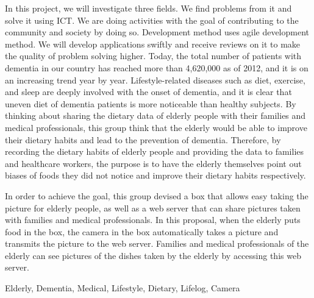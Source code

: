 \documentclass[../report]{subfiles}
\begin{document}
\begin{eabstract}
In this project, we will investigate three fields. We find problems from it and solve it using ICT. We are doing activities with the goal of contributing to the community and society by doing so. Development method uses agile development method. We will develop applications swiftly and receive reviews on it to make the quality of problem solving higher.
Today, the total number of patients with dementia in our country has reached more than 4,620,000 as of 2012, and it is on an increasing trend year by year. Lifestyle-related diseases such as diet, exercise, and sleep are deeply involved with the onset of dementia, and it is clear that uneven diet of dementia patients is more noticeable than healthy subjects. By thinking about sharing the dietary data of elderly people with their families and medical professionals, this group think that the elderly would be able to improve their dietary habits and lead to the prevention of dementia. Therefore, by recording the dietary habits of elderly people and providing the data to families and healthcare workers, the purpose is to have the elderly themselves point out biases of foods they did not notice and improve their dietary habits respectively.

In order to achieve the goal, this group devised a box that allows easy taking the picture for elderly people, as well as a web server that can share pictures taken with families and medical professionals. In this proposal, when the elderly puts food in the box, the camera in the box automatically takes a picture and transmits the picture to the web server. Families and medical professionals of the elderly can see pictures of the dishes taken by the elderly by accessing this web server.
\begin{ekeyword}
Elderly, Dementia, Medical, Lifestyle, Dietary, Lifelog, Camera
\end{ekeyword}
\end{eabstract}
\end{document}
